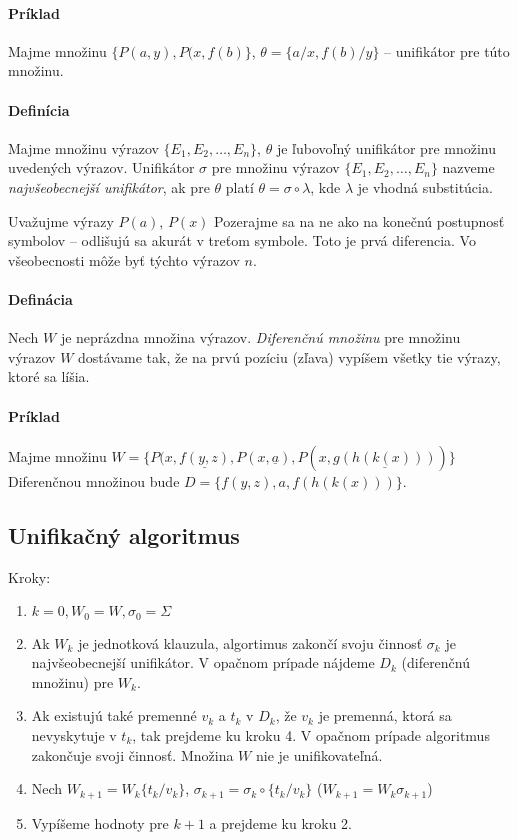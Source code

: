\paragraph{Príklad} Majme množinu $\{ P(a,y), P(x,f(b)\}$, $\theta = \{a/x,
f(b)/y\}$ -- unifikátor pre túto množinu. 

\paragraph{Definícia} Majme množinu výrazov $\{ E_1, E_2, \ldots, E_n\}$,
$\theta$ je ľubovoľný unifikátor pre množinu uvedených výrazov. Unifikátor
$\sigma$ pre množinu výrazov $\{E_1, E_2, \ldots, E_n\}$ nazveme
\emph{najvšeobecnejší unifikátor}, ak pre $\theta$ platí $\theta = \sigma \circ
\lambda$, kde $\lambda$ je vhodná substitúcia.

\par Uvažujme výrazy $P(a)$, $P(x)$ Pozerajme sa na ne ako na konečnú
postupnosť symbolov -- odlišujú sa akurát v treťom symbole. Toto je prvá
diferencia. Vo všeobecnosti môže byť týchto výrazov $n$.

\paragraph{Definácia} Nech $W$ je neprázdna množina výrazov. \emph{Diferenčnú
množinu}
pre množinu výrazov $W$ dostávame tak, že na prvú pozíciu (zľava) vypíšem všetky
tie výrazy, ktoré sa líšia. 

\paragraph{Príklad} Majme množinu $W = \{P(x,\underline{f(y,z)},
P(x,\underline{a}), P(x,\underline{g(h(k(x)))}) \}$
Diferenčnou množinou bude $D= \{ f(y,z), a, f(h(k(x)))\}$. 

\subsection{Unifikačný algoritmus}

Kroky:
\begin{enumerate}
	\item $k=0, W_0 = W, \sigma_0 = \Sigma$
	\item Ak $W_k$ je jednotková klauzula, algortimus zakončí svoju činnosť
	$\sigma_k$ je najvšeobecnejší unifikátor. V opačnom prípade nájdeme $D_k$
	(diferenčnú množinu) pre $W_k$.
	\item Ak existujú také premenné $v_k$ a $t_k$ v $D_k$, že $v_k$ je
	premenná, ktorá sa nevyskytuje v $t_k$, tak prejdeme ku kroku 4. V
	opačnom prípade algoritmus zakončuje svoji činnosť. Množina $W$ nie je
	unifikovateľná.
	\item Nech $W_{k+1} = W_k \{t_k/v_k\}$, $\sigma_{k+1} = \sigma_k \circ
	\{t_k/v_k\}$ ($W_{k+1} = W_k \sigma_{k+1}$)

	\item Vypíšeme hodnoty pre $k+1$ a prejdeme ku kroku 2.
\end{enumerate}



